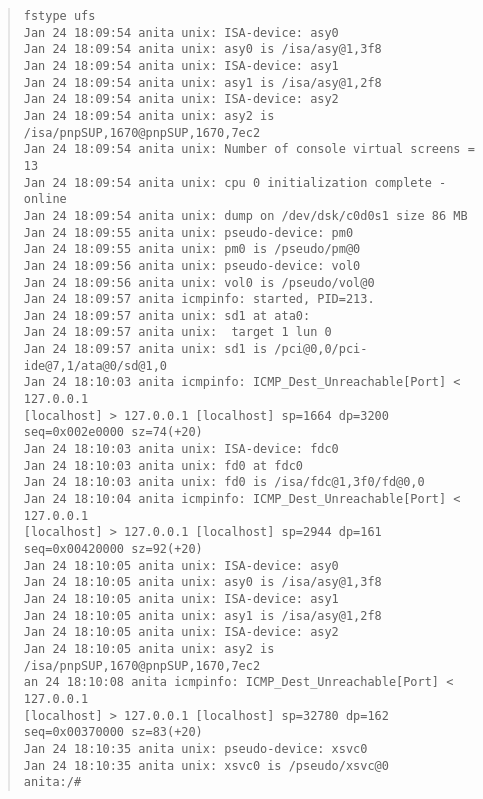 \begin{quote}
\begin{verbatim}
fstype ufs
Jan 24 18:09:54 anita unix: ISA-device: asy0
Jan 24 18:09:54 anita unix: asy0 is /isa/asy@1,3f8
Jan 24 18:09:54 anita unix: ISA-device: asy1
Jan 24 18:09:54 anita unix: asy1 is /isa/asy@1,2f8
Jan 24 18:09:54 anita unix: ISA-device: asy2
Jan 24 18:09:54 anita unix: asy2 is /isa/pnpSUP,1670@pnpSUP,1670,7ec2
Jan 24 18:09:54 anita unix: Number of console virtual screens = 13
Jan 24 18:09:54 anita unix: cpu 0 initialization complete - online
Jan 24 18:09:54 anita unix: dump on /dev/dsk/c0d0s1 size 86 MB
Jan 24 18:09:55 anita unix: pseudo-device: pm0
Jan 24 18:09:55 anita unix: pm0 is /pseudo/pm@0
Jan 24 18:09:56 anita unix: pseudo-device: vol0
Jan 24 18:09:56 anita unix: vol0 is /pseudo/vol@0
Jan 24 18:09:57 anita icmpinfo: started, PID=213.
Jan 24 18:09:57 anita unix: sd1 at ata0:
Jan 24 18:09:57 anita unix:  target 1 lun 0
Jan 24 18:09:57 anita unix: sd1 is /pci@0,0/pci-ide@7,1/ata@0/sd@1,0
Jan 24 18:10:03 anita icmpinfo: ICMP_Dest_Unreachable[Port] < 127.0.0.1 
[localhost] > 127.0.0.1 [localhost] sp=1664 dp=3200 seq=0x002e0000 sz=74(+20)
Jan 24 18:10:03 anita unix: ISA-device: fdc0
Jan 24 18:10:03 anita unix: fd0 at fdc0
Jan 24 18:10:03 anita unix: fd0 is /isa/fdc@1,3f0/fd@0,0
Jan 24 18:10:04 anita icmpinfo: ICMP_Dest_Unreachable[Port] < 127.0.0.1 
[localhost] > 127.0.0.1 [localhost] sp=2944 dp=161 seq=0x00420000 sz=92(+20)
Jan 24 18:10:05 anita unix: ISA-device: asy0
Jan 24 18:10:05 anita unix: asy0 is /isa/asy@1,3f8
Jan 24 18:10:05 anita unix: ISA-device: asy1
Jan 24 18:10:05 anita unix: asy1 is /isa/asy@1,2f8
Jan 24 18:10:05 anita unix: ISA-device: asy2
Jan 24 18:10:05 anita unix: asy2 is /isa/pnpSUP,1670@pnpSUP,1670,7ec2
an 24 18:10:08 anita icmpinfo: ICMP_Dest_Unreachable[Port] < 127.0.0.1 
[localhost] > 127.0.0.1 [localhost] sp=32780 dp=162 seq=0x00370000 sz=83(+20)
Jan 24 18:10:35 anita unix: pseudo-device: xsvc0
Jan 24 18:10:35 anita unix: xsvc0 is /pseudo/xsvc@0
anita:/#
\end{verbatim}
\end{quote}
